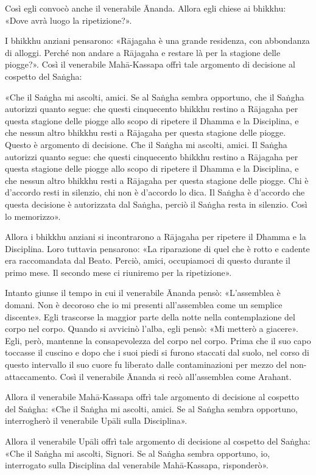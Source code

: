 Così egli convocò anche il venerabile Ānanda. Allora egli chiese ai bhikkhu:
«Dove avrà luogo la ripetizione?».

I bhikkhu anziani pensarono: «Rājagaha è una grande residenza, con abbondanza di
alloggi. Perché non andare a Rājagaha e restare là per la stagione delle
piogge?». Così il venerabile Mahā-Kassapa offrì tale argomento di decisione al
cospetto del Saṅgha:

«Che il Saṅgha mi ascolti, amici. Se al Saṅgha sembra opportuno, che il Saṅgha
autorizzi quanto segue: che questi cinquecento bhikkhu restino a Rājagaha per
questa stagione delle piogge allo scopo di ripetere il Dhamma e la Disciplina, e
che nessun altro bhikkhu resti a Rājagaha per questa stagione delle piogge.
Questo è argomento di decisione. Che il Saṅgha mi ascolti, amici. Il Saṅgha
autorizzi quanto segue: che questi cinquecento bhikkhu restino a Rājagaha per
questa stagione delle piogge allo scopo di ripetere il Dhamma e la Disciplina, e
che nessun altro bhikkhu resti a Rājagaha per questa stagione delle piogge. Chi
è d’accordo resti in silenzio, chi non è d’accordo lo dica. Il Saṅgha è
d’accordo che questa decisione è autorizzata dal Saṅgha, perciò il Saṅgha resta
in silenzio. Così lo memorizzo».

Allora i bhikkhu anziani si incontrarono a Rājagaha per ripetere il Dhamma e la
Disciplina. Loro tuttavia pensarono: «La riparazione di quel che è rotto e
cadente era raccomandata dal Beato. Perciò, amici, occupiamoci di questo durante
il primo mese. Il secondo mese ci riuniremo per la ripetizione».

Intanto giunse il tempo in cui il venerabile Ānanda pensò: «L’assemblea è
domani. Non è decoroso che io mi presenti all’assemblea come un semplice
discente». Egli trascorse la maggior parte della notte nella contemplazione del
corpo nel corpo. Quando si avvicinò l’alba, egli pensò: «Mi metterò a giacere».
Egli, però, mantenne la consapevolezza del corpo nel corpo. Prima che il suo
capo toccasse il cuscino e dopo che i suoi piedi si furono staccati dal suolo,
nel corso di questo intervallo il suo cuore fu liberato dalle contaminazioni per
mezzo del non-attaccamento. Così il venerabile Ānanda si recò all’assemblea come
Arahant.

Allora il venerabile Mahā-Kassapa offrì tale argomento di decisione al cospetto
del Saṅgha: «Che il Saṅgha mi ascolti, amici. Se al Saṅgha sembra opportuno,
interrogherò il venerabile Upāli sulla Disciplina».

Allora il venerabile Upāli offrì tale argomento di decisione al cospetto del
Saṅgha: «Che il Saṅgha mi ascolti, Signori. Se al Saṅgha sembra opportuno, io,
interrogato sulla Disciplina dal venerabile Mahā-Kassapa, risponderò».

